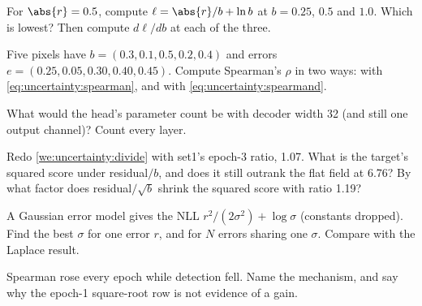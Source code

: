 \begin{checkyourself}
\item\label{ex:uncertainty:1} For $\abs{r}=0.5$, compute $\ell=\abs{r}/b+\ln b$ at $b=0.25$, $0.5$ and $1.0$.
Which is lowest? Then compute $d\ell/db$ at each of the three.
\item\label{ex:uncertainty:2} Five pixels have $b=(0.3, 0.1, 0.5, 0.2, 0.4)$ and errors
$e=(0.25,\allowbreak 0.05,\allowbreak 0.30,\allowbreak 0.40,\allowbreak 0.45)$. Compute Spearman's $\rho$ in two ways: with \cref{eq:uncertainty:spearman},
and with \cref{eq:uncertainty:spearmand}.
\item\label{ex:uncertainty:3} What would the head's parameter count be with decoder width 32 (and still one output
channel)? Count every layer.
\item\label{ex:uncertainty:4} Redo \cref{we:uncertainty:divide} with set1's epoch-3 ratio, 1.07. What is the
target's squared score under residual$/b$, and does it still outrank the flat field at 6.76? By what factor
does residual$/\sqrt b$ shrink the squared score with ratio 1.19?
\item\label{ex:uncertainty:5} A Gaussian error model gives the NLL $r^2/(2\sigma^2)+\log\sigma$ (constants
dropped). Find the best $\sigma$ for one error $r$, and for $N$ errors sharing one $\sigma$. Compare with the
Laplace result.
\item\label{ex:uncertainty:6} Spearman rose every epoch while detection fell. Name the mechanism, and say why
the epoch-1 square-root row is not evidence of a gain.
\end{checkyourself}

